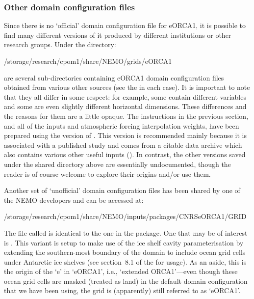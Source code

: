 \subsubsection{Other domain configuration files}
\label{sec:grids-eorca1-domcfg}

Since there is no `official' domain configuration file for eORCA1, it is possible to find many different versions of it produced by different institutions or other research groups.
Under the directory:

\begin{VerbatimFile}
/storage/research/cpom1/share/NEMO/grids/eORCA1
\end{VerbatimFile}

are several sub-directories containing eORCA1 domain configuration files obtained from various other sources (see the  in each case). 
It is important to note that they all differ in some respect: for example, some contain different variables and some are even slightly different horizontal dimensions.
These differences and the reasons for them are a little opaque.
The instructions in the previous section, and all of the inputs and atmospheric forcing interpolation weights, have been prepared using the version of \citet{delavergne2024eorca1}.
This version is recommended mainly because it is associated with a published study \citep{delavergne2026effects} and comes from a citable data archive \citep{delavergne2024eorca1} which also contains various other useful inputs ().
In contrast, the other versions saved under the shared directory above are essentially undocumented, though the reader is of course welcome to explore their origins and/or use them.

Another set of `unofficial' domain configuration files has been shared by one of the NEMO developers and can be accessed at:

\begingroup\small
\begin{VerbatimFile}
/storage/research/cpom1/share/NEMO/inputs/packages/CNRSeORCA1/GRID
\end{VerbatimFile}
\endgroup

The file called  is identical to the one in the \citet{delavergne2024eorca1} package.
One that may be of interest is .
This variant is setup to make use of the ice shelf cavity parameterisation by extending the southern-most boundary of the domain to include ocean grid cells under Antarctic ice shelves (see section~8.1 of the  for usage).
As an aside, this is the origin of the `e' in `eORCA1', i.e., `extended ORCA1'---even though these ocean grid cells are masked (treated as land) in the default domain configuration that we have been using, the grid is (apparently) still referred to as `eORCA1'.


